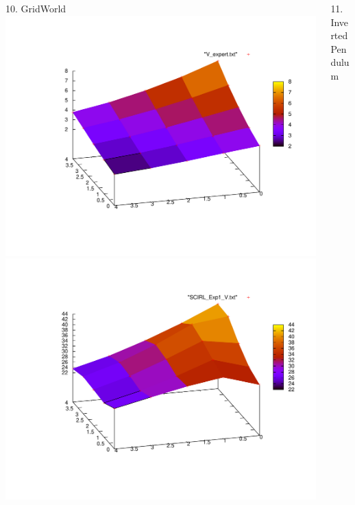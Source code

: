 \documentclass[xcolor=x11names,12pt]{beamer}
\begin{document}
\begin{frame}
\begin{columns}
\begin{column}{.48\textwidth}
\begin{block}{10. GridWorld}
          \includegraphics[width=.52\textwidth]{V_expert.pdf}\hspace{-100pt}\includegraphics[width=.52\textwidth]{SCIRL_Exp1_V.pdf}
\vspace{-90pt}
      \end{block}
    \end{column}
    \begin{column}{.48\textwidth}
      \begin{block}{11. Inverted Pendulum}
        \centering
        \fontsize{11pt}{11pt}\selectfont
        \resizebox{.95\columnwidth}{!}{

}
\end{block}
\end{column}
\end{columns}
\end{frame}
\end{document}
